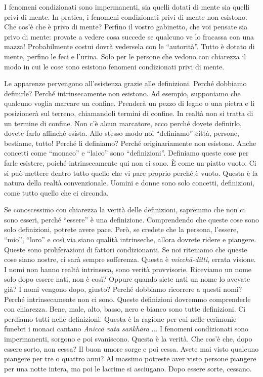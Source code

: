 I fenomeni condizionati sono impermanenti, sia quelli dotati di mente
sia quelli privi di mente. In pratica, i fenomeni condizionati privi di
mente non esistono. Che cos'è che è privo di mente? Perfino il vostro
gabinetto, che voi pensate sia privo di mente: provate a vedere cosa
succede se qualcuno ve lo fracassa con una mazza! Probabilmente costui
dovrà vedersela con le ``autorità''. Tutto è dotato di mente, perfino le
feci e l'urina. Solo per le persone che vedono con chiarezza il modo in
cui le cose sono esistono fenomeni condizionati privi di mente.

Le apparenze pervengono all'esistenza grazie alle definizioni. Perché
dobbiamo definirle? Perché intrinsecamente non esistono. Ad esempio,
supponiamo che qualcuno voglia marcare un confine. Prenderà un pezzo di
legno o una pietra e li posizionerà sul terreno, chiamandoli termini di
confine. In realtà non si tratta di un termine di confine. Non c'è alcun
marcatore, ecco perché dovete definirlo, dovete farlo affinché esista.
Allo stesso modo noi ``definiamo'' città, persone, bestiame, tutto!
Perché li definiamo? Perché originariamente non esistono. Anche concetti
come ``monaco'' e ``laico'' sono ``definizioni''. Definiamo queste cose
per farle esistere, poiché intrinsecamente qui non ci sono. È come un
piatto vuoto. Ci si può mettere dentro tutto quello che vi pare proprio
perché è vuoto. Questa è la natura della realtà convenzionale. Uomini e
donne sono solo concetti, definizioni, come tutto quello che ci
circonda.

Se conoscessimo con chiarezza la verità delle definizioni, sapremmo che
non ci sono esseri, perché ``essere'' è una definizione. Comprendendo
che queste cose sono solo definizioni, potrete avere pace. Però, se
credete che la persona, l'essere, ``mio'', ``loro'' e così via siano
qualità intrinseche, allora dovrete ridere e piangere. Queste sono
proliferazioni di fattori condizionanti. Se noi riteniamo che queste
cose siano nostre, ci sarà sempre sofferenza. Questa è
\emph{micchā-ditti}, errata visione. I nomi non hanno realtà intrinseca,
sono verità provvisorie. Riceviamo un nome solo dopo essere nati, non è
così? Oppure quando siete nati un nome lo avevate già? I nomi vengono
dopo, giusto? Perché dobbiamo ricorrere a questi nomi? Perché
intrinsecamente non ci sono. Queste definizioni dovremmo comprenderle
con chiarezza. Bene, male, alto, basso, nero e bianco sono tutte
definizioni. Ci perdiamo tutti nelle definizioni. Questa è la ragione
per cui nelle cerimonie funebri i monaci cantano \emph{Aniccā vata
saṅkhāra} ... I fenomeni condizionati sono impermanenti, sorgono e poi
svaniscono. Questa è la verità. Che cos'è che, dopo essere sorto, non
cessa? Il buon umore sorge e poi cessa. Avete mai visto qualcuno
piangere per tre o quattro anni? Al massimo potreste aver visto persone
piangere per una notte intera, ma poi le lacrime si asciugano. Dopo
essere sorte, cessano.

